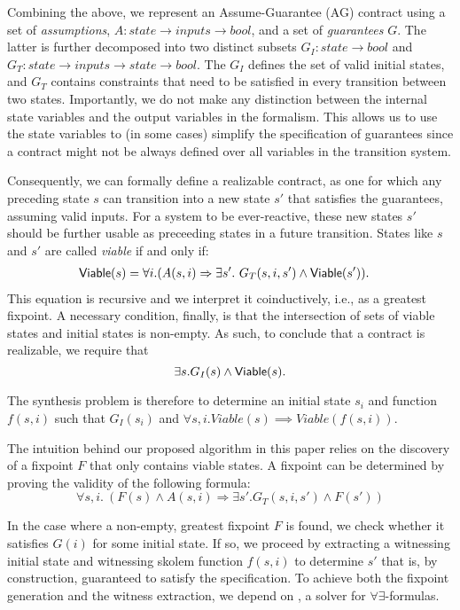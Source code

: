 Combining the above, we represent an Assume-Guarantee (AG) contract using a set
of \emph{assumptions}, $A: state \rightarrow inputs \rightarrow bool$,
and a set of \emph{guarantees} $G$. The latter is further decomposed into two
distinct subsets $G_I: state \rightarrow bool$ and $G_T: state \rightarrow
inputs \rightarrow state \rightarrow bool$. The $G_I$ defines the set of valid
initial states, and $G_T$ contains constraints that need to be satisfied in
every transition between two states. Importantly, we
do not make any distinction between the internal state variables and the output variables in the
formalism. This allows us to use the state variables to (in some cases)
simplify the specification of guarantees since a contract
might not be always defined over all variables in the transition system.

Consequently, we can formally define a realizable contract, as one for which any
preceding state $s$ can  transition into a new state $s'$ that satisfies
the guarantees, assuming valid inputs. For a system to be ever-reactive, these
new states $s'$ should be further usable as preceeding states in a future
transition. States like $s$ and $s'$ are called \textit{viable} if
and only if:
\begin{align}
\begin{split}
  {\mathsf {Viable}}(s) &=
  \forall i. (A(s, i) \Rightarrow \exists s'.~ G_T(s, i,s')
\land {\mathsf {Viable}}(s')).
\label{eq:viable}
\end{split}
\end{align}
This equation is recursive and we interpret it coinductively, i.e., as a
greatest fixpoint.
A necessary condition, finally, is that the intersection of sets of viable states
and initial states is non-empty. As such, to conclude that a contract
is realizable, we require that
\begin{equation}
\exists s. G_I(s) \land {\mathsf {Viable}}(s).
\label{eq:nonempty}
\end{equation}

\noindent The synthesis problem is therefore to determine an initial state $s_i$ and function $f(s, i)$ such that $G_I(s_i)$ and $\forall s, i . Viable(s) \implies Viable(f(s, i))$.

The intuition behind our proposed algorithm in this paper relies on the
discovery of a fixpoint $F$ that only contains viable states.  A fixpoint can be determined by proving the validity of the following formula:
\[
\forall s,i. \ (F(s) \land A(s,i) \Rightarrow \exists s'.G_{T}(s,i,s') \land F(s'))
\]

\noindent In the case where a non-empty, greatest fixpoint $F$ is found, we check whether it satisfies $G(i)$ for some initial state.  If so, we proceed by extracting a witnessing initial state and witnessing skolem function $f(s, i)$ to determine $s'$ that is, by construction, guaranteed to satisfy the specification.
To achieve both the fixpoint generation and the witness extraction, we depend on \aeval, a solver for $\forall\exists$-formulas.


